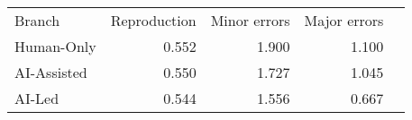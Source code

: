 \begin{tabular}{lrrrr}
\hline\hline
Branch & Reproduction & Minor errors & Major errors \\
Human-Only & 0.552 & 1.900 & 1.100 \\
AI-Assisted & 0.550 & 1.727 & 1.045 \\
AI-Led & 0.544 & 1.556 & 0.667 \\
\hline\hline
\end{tabular}
